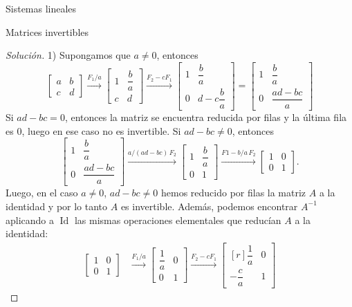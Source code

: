 \documentclass[a4paper,12pt,twoside,spanish,reqno]{amsbook}
\theoremstyle{definition}
\theoremstyle{remark}
\newcommand{\Id}{\operatorname{Id}}
\begin{document}
\begin{chapter}{Sistemas lineales}
\begin{section}{Matrices invertibles}
\begin{proof}[Solución]
				1) Supongamos que  $a\not=0$, entonces 
				\begin{equation*}
				\begin{bmatrix}a&b\\c&d\end{bmatrix} \stackrel{F_1/a}{\longrightarrow}
				\begin{bmatrix}1&\dfrac{b}{a}\\[6pt]c&d\end{bmatrix} \stackrel{F_2 -cF_1}{\longrightarrow}
				\begin{bmatrix}1&\dfrac{b}{a}\\[6pt]0&d- c\dfrac{b}{a}\end{bmatrix} =
				\begin{bmatrix}1&\dfrac{b}{a}\\[6pt]0&\dfrac{ad-bc}{a}\end{bmatrix}
				\end{equation*}   
				Si $ad-bc=0$,  entonces la matriz se encuentra reducida por filas y la última fila es $0$, luego en ese caso no es invertible.  Si $ad-bc\not=0$, entonces
				\begin{equation*}
				\begin{bmatrix}1&\dfrac{b}{a}\\[8pt]0&\dfrac{ad-bc}{a}\end{bmatrix} \stackrel{a/(ad-bc)\,F_2}{\longrightarrow}
				\begin{bmatrix}1&\dfrac{b}{a}\\[6pt]0&1\end{bmatrix}
				\stackrel{F1-b/a\,F_2}{\longrightarrow}
				\begin{bmatrix}1&0\\0&1\end{bmatrix}.
				\end{equation*} 
				Luego, en el caso $a\not=0$, $ad-bc\not=0$ hemos reducido por filas la matriz $A$  a la identidad y por lo tanto $A$  es invertible. Además, podemos encontrar $A^{-1}$ aplicando a $\Id$ las mismas operaciones elementales que reducían $A$ a la identidad:
				\begin{align*}
				\begin{bmatrix}1&0\\0&1\end{bmatrix} 
				&\stackrel{F_1/a}{\longrightarrow}
				\begin{bmatrix}\dfrac1a&0\\[8pt]0&1\end{bmatrix} 
				\stackrel{F_2 -cF_1}{\longrightarrow}
				\begin{bmatrix*}[r]\dfrac1a&0\\[8pt]-\dfrac{c}{a}&1\end{bmatrix*}

\end{align*}
\end{proof}
\end{section}
\end{chapter}
\end{document}
